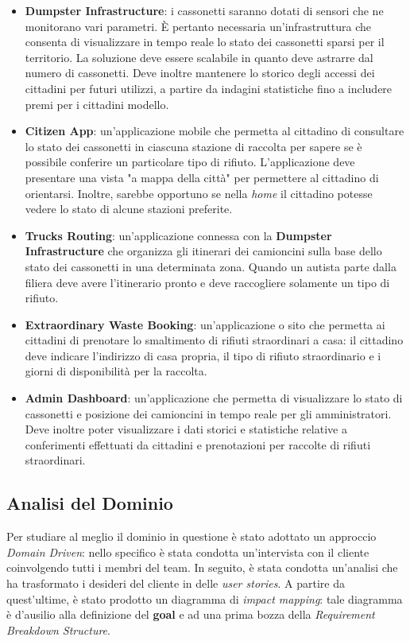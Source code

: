 \begin{itemize}
    \item \textbf{Dumpster Infrastructure}: i cassonetti saranno dotati di sensori che ne monitorano vari parametri.
    È pertanto necessaria un'infrastruttura che consenta di visualizzare in tempo reale lo stato dei cassonetti sparsi per il territorio.
    La soluzione deve essere scalabile in quanto deve astrarre dal numero di cassonetti.
    Deve inoltre mantenere lo storico degli accessi dei cittadini per futuri utilizzi, a partire da indagini statistiche fino a includere premi per i cittadini modello.
    \item \textbf{Citizen App}: un'applicazione mobile che permetta al cittadino di consultare lo stato dei cassonetti in ciascuna stazione di raccolta per sapere se è possibile conferire un particolare tipo di rifiuto.
    L'applicazione deve presentare una vista "a mappa della città" per permettere al cittadino di orientarsi.
    Inoltre, sarebbe opportuno se nella \textit{home} il cittadino potesse vedere lo stato di alcune stazioni preferite.
    \item \textbf{Trucks Routing}: un'applicazione connessa con la \textbf{Dumpster Infrastructure} che organizza gli itinerari dei camioncini sulla base dello stato dei cassonetti in una determinata zona.
    Quando un autista parte dalla filiera deve avere l'itinerario pronto e deve raccogliere solamente un tipo di rifiuto.
    \item \textbf{Extraordinary Waste Booking}: un'applicazione o sito che permetta ai cittadini di prenotare lo smaltimento di rifiuti straordinari a casa: il cittadino deve indicare l'indirizzo di casa propria, il tipo di rifiuto straordinario e i giorni di disponibilità per la raccolta.
    \item \textbf{Admin Dashboard}: un'applicazione che permetta di visualizzare lo stato di cassonetti e posizione dei camioncini in tempo reale per gli amministratori.
    Deve inoltre poter visualizzare i dati storici e statistiche relative a conferimenti effettuati da cittadini e prenotazioni per raccolte di rifiuti straordinari.
\end{itemize}

\subsection{Analisi del Dominio}
Per studiare al meglio il dominio in questione è stato adottato un approccio \textit{Domain Driven}: nello specifico è stata condotta un'intervista con il cliente coinvolgendo tutti i membri del team. In seguito, è stata condotta un'analisi che ha trasformato i desideri del cliente in delle \textit{user stories}. A partire da quest'ultime, è stato prodotto un diagramma di \textit{impact mapping}: tale diagramma è d'ausilio alla definizione del \textbf{goal} e ad una prima bozza della \textit{Requirement Breakdown Structure}.


